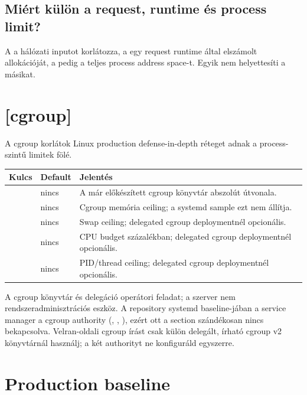 \subsection*{Miért külön a request, runtime és process limit?}

A  a hálózati inputot korlátozza, a  egy request runtime által elszámolt allokációját, a  pedig a teljes process address space-t. Egyik nem helyettesíti a másikat.

\section{[cgroup]}

A cgroup korlátok Linux production defense-in-depth réteget adnak a process-szintű limitek fölé.

\begin{longtable}{L{0.34\textwidth}L{0.18\textwidth}L{0.38\textwidth}}
\toprule
Kulcs & Default & Jelentés \\
\midrule
{} & nincs & A már előkészített cgroup könyvtár abszolút útvonala. \\
 & nincs & Cgroup memória ceiling; a systemd sample ezt nem állítja. \\
 & nincs & Swap ceiling; delegated cgroup deploymentnél opcionális. \\
 & nincs & CPU budget százalékban; delegated cgroup deploymentnél opcionális. \\
 & nincs & PID/thread ceiling; delegated cgroup deploymentnél opcionális. \\
\bottomrule
\end{longtable}

A cgroup könyvtár és delegáció operátori feladat; a szerver nem rendszeradminisztrációs eszköz. A repository systemd baseline-jában a service manager a cgroup authority (, , ), ezért ott a \code{[cgroup]} section szándékosan nincs bekapcsolva. Velran-oldali cgroup írást csak külön delegált, írható cgroup v2 könyvtárnál használj; a két authorityt ne konfiguráld egyszerre.

\section{Production baseline}

